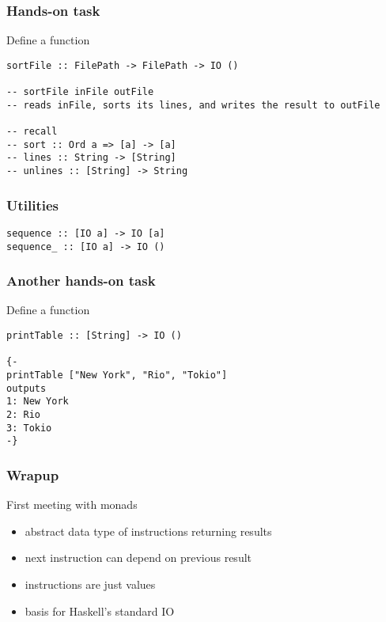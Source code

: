 \documentclass{beamer}
\begin{document}
\begin{frame}[fragile]
  \frametitle{Hands-on task}
  Define a function
\begin{verbatim}
sortFile :: FilePath -> FilePath -> IO ()

-- sortFile inFile outFile 
-- reads inFile, sorts its lines, and writes the result to outFile

-- recall
-- sort :: Ord a => [a] -> [a]
-- lines :: String -> [String]
-- unlines :: [String] -> String
\end{verbatim}
\end{frame}
\begin{frame}[fragile]
  \frametitle{Utilities}
\begin{verbatim}
sequence :: [IO a] -> IO [a]
sequence_ :: [IO a] -> IO ()
\end{verbatim}
\end{frame}
\begin{frame}[fragile]
  \frametitle{Another hands-on task}
  Define a function
\begin{verbatim}
printTable :: [String] -> IO ()

{-
printTable ["New York", "Rio", "Tokio"]
outputs
1: New York
2: Rio
3: Tokio
-} 
\end{verbatim}
\end{frame}
\begin{frame}
  \frametitle{Wrapup}
  \begin{alertblock}{First meeting with monads}
  \begin{itemize}
  \item abstract data type of instructions returning results
  \item next instruction can depend on previous result
  \item instructions are just values
  \item basis for Haskell's standard IO
  \end{itemize}
  \end{alertblock}
\end{frame}

\end{document}
